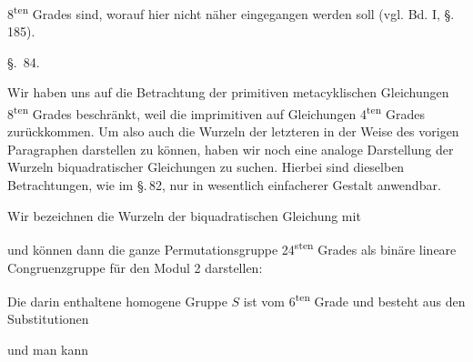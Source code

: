8\textsuperscript{ten} Grades sind, worauf hier nicht näher eingegangen
werden soll (vgl. Bd. I, \S.\,185).

\begin{center}
\S.\ 84.

\end{center}

Wir haben uns auf die Betrachtung der primitiven metacyklischen
Gleichungen 8\textsuperscript{ten} Grades beschränkt, weil die imprimitiven
auf Gleichungen 4\textsuperscript{ten} Grades zurückkommen. Um also auch die
Wurzeln der letzteren in der Weise des vorigen Paragraphen darstellen zu
können, haben wir noch eine analoge Darstellung der Wurzeln biquadratischer
Gleichungen zu suchen. Hierbei sind dieselben Betrachtungen, wie im
\S.\,82, nur in wesentlich einfacherer Gestalt anwendbar.

Wir bezeichnen die Wurzeln der biquadratischen Gleichung mit

und können dann die ganze Permutationsgruppe 24\textsuperscript{sten}
Grades als binäre lineare Congruenzgruppe für den Modul 2 darstellen:

Die darin enthaltene homogene Gruppe $S$ ist vom 6\textsuperscript{ten}
Grade und besteht aus den Substitutionen

und man kann

